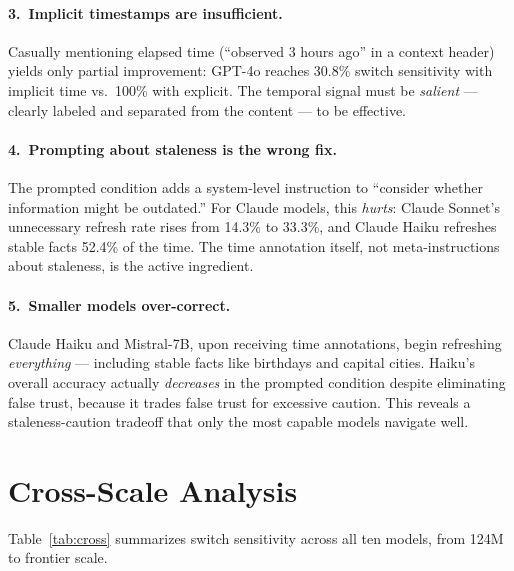 \documentclass[11pt,a4paper]{article}
\begin{document}
\paragraph{3.\ Implicit timestamps are insufficient.}
Casually mentioning elapsed time (``observed 3 hours ago'' in a context header) yields only partial improvement: GPT-4o reaches 30.8\% switch sensitivity with implicit time vs.\ 100\% with explicit.
The temporal signal must be \emph{salient} --- clearly labeled and separated from the content --- to be effective.

\paragraph{4.\ Prompting about staleness is the wrong fix.}
The prompted condition adds a system-level instruction to ``consider whether information might be outdated.''
For Claude models, this \emph{hurts}: Claude Sonnet's unnecessary refresh rate rises from 14.3\% to 33.3\%, and Claude Haiku refreshes stable facts 52.4\% of the time.
The time annotation itself, not meta-instructions about staleness, is the active ingredient.

\paragraph{5.\ Smaller models over-correct.}
Claude Haiku and Mistral-7B, upon receiving time annotations, begin refreshing \emph{everything} --- including stable facts like birthdays and capital cities.
Haiku's overall accuracy actually \emph{decreases} in the prompted condition despite eliminating false trust, because it trades false trust for excessive caution.
This reveals a staleness-caution tradeoff that only the most capable models navigate well.

\section{Cross-Scale Analysis}
\label{sec:cross}

Table~\ref{tab:cross} summarizes switch sensitivity across all ten models, from 124M to frontier scale.
\end{document}
